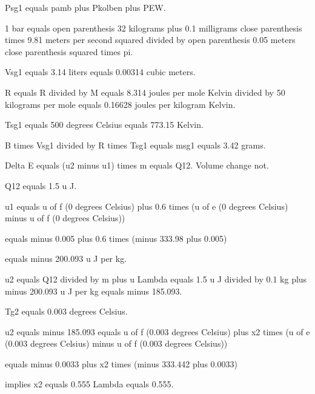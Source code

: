 Psg1 equals pamb plus Pkolben plus PEW.

1 bar equals open parenthesis 32 kilograms plus 0.1 milligrams close parenthesis times 9.81 meters per second squared divided by open parenthesis 0.05 meters close parenthesis squared times pi.

Vsg1 equals 3.14 liters equals 0.00314 cubic meters.

R equals R divided by M equals 8.314 joules per mole Kelvin divided by 50 kilograms per mole equals 0.16628 joules per kilogram Kelvin.

Tsg1 equals 500 degrees Celsius equals 773.15 Kelvin.

B times Vsg1 divided by R times Tsg1 equals msg1 equals 3.42 grams.

Delta E equals (u2 minus u1) times m equals Q12. Volume change not.

Q12 equals 1.5 u J.

u1 equals u of f (0 degrees Celsius) plus 0.6 times (u of e (0 degrees Celsius) minus u of f (0 degrees Celsius))

equals minus 0.005 plus 0.6 times (minus 333.98 plus 0.005)

equals minus 200.093 u J per kg.

u2 equals Q12 divided by m plus u Lambda equals 1.5 u J divided by 0.1 kg plus minus 200.093 u J per kg equals minus 185.093.

Tg2 equals 0.003 degrees Celsius.

u2 equals minus 185.093 equals u of f (0.003 degrees Celsius) plus x2 times (u of e (0.003 degrees Celsius) minus u of f (0.003 degrees Celsius))

equals minus 0.0033 plus x2 times (minus 333.442 plus 0.0033)

implies x2 equals 0.555 Lambda equals 0.555.